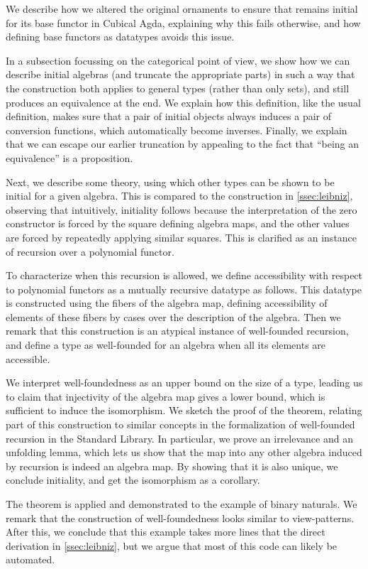 We describe how we altered the original ornaments \cite{progorn} to ensure that  remains initial for its base functor in Cubical Agda, explaining why this fails otherwise, and how defining base functors as datatypes avoids this issue.

In a subsection focussing on the categorical point of view, we show how we can describe initial algebras (and truncate the appropriate parts) in such a way that the construction both applies to general types (rather than only sets), and still produces an equivalence at the end. We explain how this definition, like the usual definition, makes sure that a pair of initial objects always induces a pair of conversion functions, which automatically become inverses. Finally, we explain that we can escape our earlier truncation by appealing to the fact that ``being an equivalence'' is a proposition.

Next, we describe some theory, using which other types can be shown to be initial for a given algebra. This is compared to the construction in \autoref{ssec:leibniz}, observing that intuitively, initiality follows because the interpretation of the zero constructor is forced by the square defining algebra maps, and the other values are forced by repeatedly applying similar squares. This is clarified as an instance of recursion over a polynomial functor.

To characterize when this recursion is allowed, we define accessibility with respect to polynomial functors as a mutually recursive datatype as follows. This datatype is constructed using the fibers of the algebra map, defining accessibility of elements of these fibers by cases over the description of the algebra. Then we remark that this construction is an atypical instance of well-founded recursion, and define a type as well-founded for an algebra when all its elements are accessible.

We interpret well-foundedness as an upper bound on the size of a type, leading us to claim that injectivity of the algebra map gives a lower bound, which is sufficient to induce the isomorphism. We sketch the proof of the theorem, relating part of this construction to similar concepts in the formalization of well-founded recursion in the Standard Library. In particular, we prove an irrelevance and an unfolding lemma, which lets us show that the map into any other algebra induced by recursion is indeed an algebra map. By showing that it is also unique, we conclude initiality, and get the isomorphism as a corollary. 

The theorem is applied and demonstrated to the example of binary naturals. We remark that the construction of well-foundedness looks similar to view-patterns. After this, we conclude that this example takes more lines that the direct derivation in \autoref{ssec:leibniz}, but we argue that most of this code can likely be automated.


%
